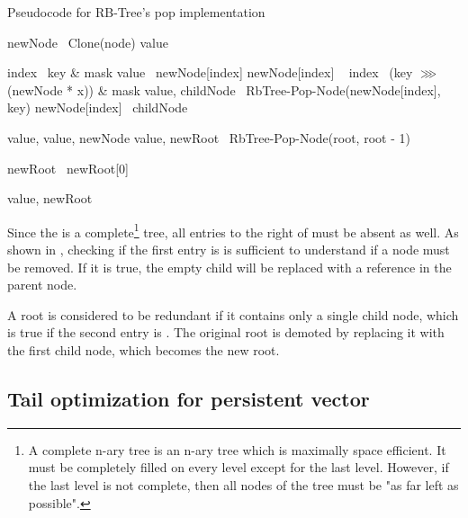 \begin{listing}[ht!]
    \caption{Pseudocode for RB-Tree's pop implementation}
    \label{lst:rb-tree-pop}

    \begin{algorithmic}
            \State newNode \la\ Clone(node)
            \State value \la\ \nil{}

                \State index \la\ key \& mask
                \State value \la\ newNode[index]
                \State newNode[index] \la\ \nil{}
            \Else
                \State index \la\ (key $\ggg$ (newNode * x)) \& mask
                \State value, childNode \la\ RbTree-Pop-Node(newNode[index], key)
                \State newNode[index] \la\ childNode
            \EndIf

                \State \Return value, \nil{}
            \Else
                \State \Return value, newNode
            \EndIf
        \EndFunction
        \State
            \State value, newRoot \la\ RbTree-Pop-Node(root, root - 1)

                \State newRoot \la\ newRoot[0]
            \EndIf

            \State \Return value, newRoot
        \EndFunction
    \end{algorithmic}
\end{listing}

Since the \rbtree{} is a complete\footnote{A complete n-ary tree is an n-ary tree which is maximally space efficient. It must be completely filled on every level except for the last level. However, if the last level is not complete, then all nodes of the tree must be "as far left as possible".} tree, all entries to the right of \nil{} must be absent as well. As shown in , checking if the first entry is \nil{} is sufficient to understand if a node must be removed. If it is true, the empty child will be replaced with a \nil{} reference in the parent node.

A root is considered to be redundant if it contains only a single child node, which is true if the second entry is \nil{}.  The original root is demoted by replacing it with the first child node, which becomes the new root.

\subsection{Tail optimization for persistent vector}
\label{sec:tail-optimization}

